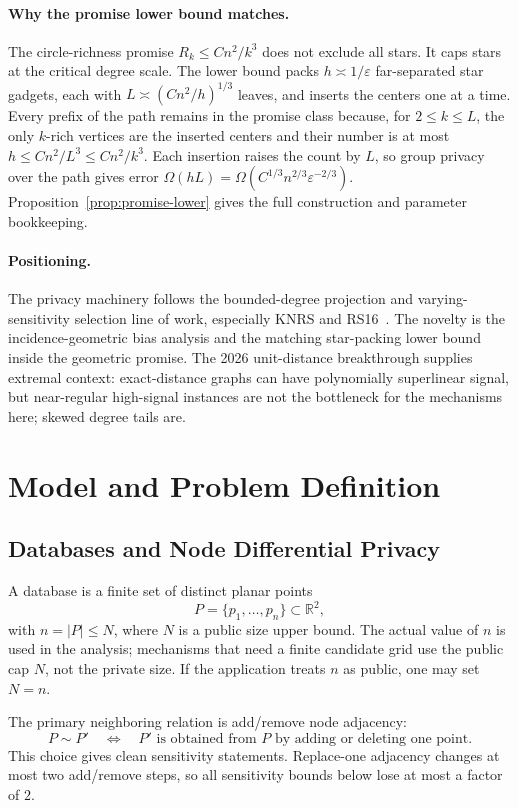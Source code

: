 \documentclass[11pt]{article}
\newcommand{\R}{\mathbb{R}}
\newcommand{\eps}{\varepsilon}
\begin{document}
\paragraph{Why the promise lower bound matches.}
The circle-richness promise \(R_k\le Cn^2/k^3\) does not exclude all stars. It caps stars at the critical degree scale. The lower bound packs \(h\asymp1/\eps\) far-separated star gadgets, each with \(L\asymp(Cn^2/h)^{1/3}\) leaves, and inserts the centers one at a time. Every prefix of the path remains in the promise class because, for \(2\le k\le L\), the only \(k\)-rich vertices are the inserted centers and their number is at most \(h\le Cn^2/L^3\le Cn^2/k^3\). Each insertion raises the count by \(L\), so group privacy over the path gives error \(\Omega(hL)=\Omega(C^{1/3}n^{2/3}\eps^{-2/3})\). Proposition~\ref{prop:promise-lower} gives the full construction and parameter bookkeeping.

\paragraph{Positioning.}
The privacy machinery follows the bounded-degree projection and varying-sensitivity selection line of work, especially KNRS and RS16~\cite{KNRS13,RS16}. The novelty is the incidence-geometric bias analysis and the matching star-packing lower bound inside the geometric promise. The 2026 unit-distance breakthrough supplies extremal context: exact-distance graphs can have polynomially superlinear signal, but near-regular high-signal instances are not the bottleneck for the mechanisms here; skewed degree tails are.

\section{Model and Problem Definition}

\subsection{Databases and Node Differential Privacy}

A database is a finite set of distinct planar points
\[
P=\{p_1,\ldots,p_n\}\subset \R^2,
\]
with \(n=|P|\le N\), where \(N\) is a public size upper bound. The actual value of \(n\) is used in the analysis; mechanisms that need a finite candidate grid use the public cap \(N\), not the private size. If the application treats \(n\) as public, one may set \(N=n\).

The primary neighboring relation is add/remove node adjacency:
\[
P\sim P' \quad\Longleftrightarrow\quad P' \text{ is obtained from } P \text{ by adding or deleting one point.}
\]
This choice gives clean sensitivity statements. Replace-one adjacency changes at most two add/remove steps, so all sensitivity bounds below lose at most a factor of \(2\).
\end{document}
